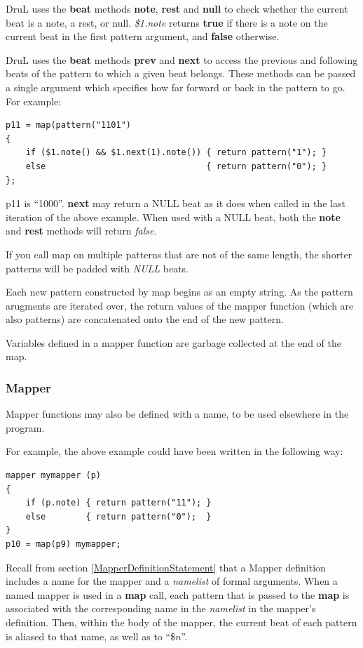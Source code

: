 \documentclass[11pt,twoside]{article}
\begin{document}
DruL uses the \textbf{beat} methods \textbf{note}, \textbf{rest} and \textbf{null} to check whether
the current beat is a note, a rest, or null.  
\textit{\$1.note} returns \textbf{true} if there is a note on the current beat in the first pattern argument, and \textbf{false} otherwise.

DruL uses the \textbf{beat} methods \textbf{prev} and \textbf{next} to access the previous and following beats of the pattern to which a given beat belongs. These methods can be passed a single argument which specifies how far forward or back in the pattern to go.  For example:
\begin{verbatim}
p11 = map(pattern("1101")
{
    if ($1.note() && $1.next(1).note()) { return pattern("1"); }
    else                                { return pattern("0"); }
};
\end{verbatim}
p11 is ``1000''.  \textbf{next} may return a NULL beat as it does when called in the last iteration of the above example.  When used with a NULL beat, both the \textbf{note} and \textbf{rest} methods will return \textit{false}.  

If you call map on multiple patterns that are not of the same length, the shorter patterns will be padded with \textit{NULL} beats.

Each new pattern constructed by map begins as an empty string.  As the pattern arugments are iterated over, the return values of the mapper function (which are also patterns) are concatenated onto the end of the new pattern.

Variables defined in a mapper function are garbage collected at the end of the map.

\subsubsection{Mapper}

Mapper functions may also be defined with a name, to be used elsewhere in the program.

For example, the above example could have been written in the following way:
\begin{verbatim}
mapper mymapper (p)
{
    if (p.note) { return pattern("11"); }
    else        { return pattern("0");  }
}
p10 = map(p9) mymapper;
\end{verbatim}

Recall from section \ref{MapperDefinitionStatement} that a  Mapper definition includes a name for the mapper and  a \emph{namelist} of formal arguments.
When a named mapper is used in a \textbf{map} call, each pattern that is passed to the \textbf{map} is associated with the corresponding name in the \emph{namelist} in the mapper's definition.
Then, within the body of the mapper, the current beat of each pattern is aliased to that name, as well as to ``\$$n$''.
\end{document}
